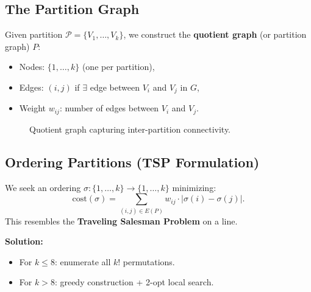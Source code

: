 \documentclass[11pt,a4paper]{article}
\theoremstyle{definition}
\theoremstyle{plain}
\theoremstyle{remark}
\begin{document}
\subsection{The Partition Graph}

Given partition $\mathcal{P} = \{V_1, \ldots, V_k\}$, we construct the
\textbf{quotient graph} (or partition graph) $P$:
\begin{itemize}
  \item Nodes: $\{1, \ldots, k\}$ (one per partition),
  \item Edges: $(i, j)$ if $\exists$ edge between $V_i$ and $V_j$ in $G$,
  \item Weight $w_{ij}$: number of edges between $V_i$ and $V_j$.
\end{itemize}

\begin{figure}[h]
\centering
{}
\caption{Quotient graph capturing inter-partition connectivity.}
\end{figure}

\subsection{Ordering Partitions (TSP Formulation)}

We seek an ordering $\sigma: \{1,\ldots,k\} \to \{1,\ldots,k\}$ minimizing:
\[
  \text{cost}(\sigma) = \sum_{(i,j) \in E(P)} w_{ij} \cdot |\sigma(i) - \sigma(j)|.
\]
This resembles the \textbf{Traveling Salesman Problem} on a line.

\textbf{Solution:}
\begin{itemize}
  \item For $k \leq 8$: enumerate all $k!$ permutations.
  \item For $k > 8$: greedy construction + 2-opt local search.
\end{itemize}
\end{document}
